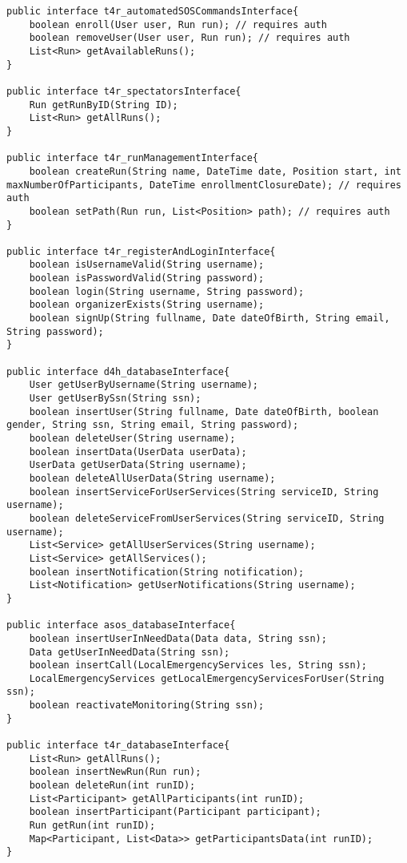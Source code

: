\documentclass[../../DD.tex]{subfiles}
\begin{document}
\begin{lstlisting}
public interface t4r_automatedSOSCommandsInterface{
	boolean enroll(User user, Run run); // requires auth
	boolean removeUser(User user, Run run); // requires auth
	List<Run> getAvailableRuns();
}

public interface t4r_spectatorsInterface{
	Run getRunByID(String ID);
	List<Run> getAllRuns();
}

public interface t4r_runManagementInterface{
	boolean createRun(String name, DateTime date, Position start, int maxNumberOfParticipants, DateTime enrollmentClosureDate); // requires auth
	boolean setPath(Run run, List<Position> path); // requires auth
}

public interface t4r_registerAndLoginInterface{
	boolean isUsernameValid(String username);
	boolean isPasswordValid(String password);
	boolean login(String username, String password);
	boolean organizerExists(String username);
	boolean signUp(String fullname, Date dateOfBirth, String email, String password);
}

public interface d4h_databaseInterface{
	User getUserByUsername(String username);
	User getUserBySsn(String ssn);
	boolean insertUser(String fullname, Date dateOfBirth, boolean gender, String ssn, String email, String password);
	boolean deleteUser(String username);
	boolean insertData(UserData userData);
	UserData getUserData(String username);
	boolean deleteAllUserData(String username);
	boolean insertServiceForUserServices(String serviceID, String username);
	boolean deleteServiceFromUserServices(String serviceID, String username);
	List<Service> getAllUserServices(String username);
	List<Service> getAllServices();
	boolean insertNotification(String notification);
	List<Notification> getUserNotifications(String username);
}

public interface asos_databaseInterface{
	boolean insertUserInNeedData(Data data, String ssn);
	Data getUserInNeedData(String ssn);
	boolean insertCall(LocalEmergencyServices les, String ssn);
	LocalEmergencyServices getLocalEmergencyServicesForUser(String ssn);
	boolean reactivateMonitoring(String ssn);
}

public interface t4r_databaseInterface{
	List<Run> getAllRuns();
	boolean insertNewRun(Run run);
	boolean deleteRun(int runID);
	List<Participant> getAllParticipants(int runID);
	boolean insertParticipant(Participant participant);
	Run getRun(int runID);
	Map<Participant, List<Data>> getParticipantsData(int runID);
}

\end{lstlisting}
\end{document}
